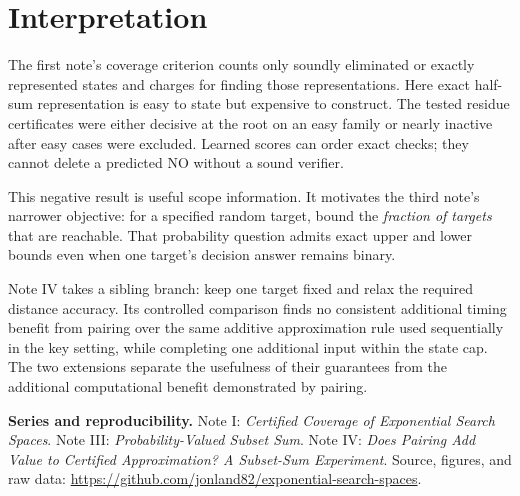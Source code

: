 \documentclass[10pt,english]{article}
\begin{document}
\section{Interpretation}
The first note's coverage criterion counts only soundly eliminated or exactly represented states and charges for finding those representations. Here exact half-sum representation is easy to state but expensive to construct. The tested residue certificates were either decisive at the root on an easy family or nearly inactive after easy cases were excluded. Learned scores can order exact checks; they cannot delete a predicted NO without a sound verifier.

This negative result is useful scope information. It motivates the third note's narrower objective: for a specified random target, bound the \emph{fraction of targets} that are reachable. That probability question admits exact upper and lower bounds even when one target's decision answer remains binary.

Note IV takes a sibling branch: keep one target fixed and relax the required distance accuracy. Its controlled comparison finds no consistent additional timing benefit from pairing over the same additive approximation rule used sequentially in the key setting, while completing one additional input within the state cap. The two extensions separate the usefulness of their guarantees from the additional computational benefit demonstrated by pairing.

\vspace{.4em}
\noindent\textbf{Series and reproducibility.} Note I: \emph{Certified Coverage of Exponential Search Spaces}. Note III: \emph{Probability-Valued Subset Sum}. Note IV: \emph{Does Pairing Add Value to Certified Approximation? A Subset-Sum Experiment}. Source, figures, and raw data: \url{https://github.com/jonland82/exponential-search-spaces}.
\end{document}

